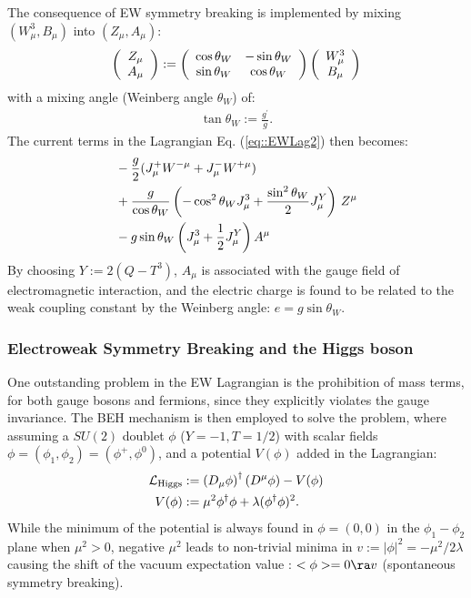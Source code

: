 The consequence of EW symmetry breaking is implemented by mixing $(W_\mu^3, B_\mu)$ into $(Z_\mu, A_\mu)$:
\begin{align}
\left( \begin{array}{c} Z_\mu \\ A_\mu \end{array} \right) := 
     \left(
   \begin{array}{cc}
     \cos{\theta_W} &  -\sin{\theta_W} \\ 
     \sin{\theta_W} &  \cos{\theta_W} 
   \end{array}
     \right)
 \left( \begin{array}{c} W_\mu^3 \\ B_\mu \end{array} \right)
\end{align}
with a mixing angle (Weinberg angle $\theta_W$) of:
\begin{align}
\tan{\theta_W} := \frac{g^{'}}{g}.
\end{align}
%
The current terms in the Lagrangian Eq. (\ref{eq::EWLag2}) then becomes:
\begin{align}
 & -\frac{g}{2} (J_\mu^+ W^{-\mu} + J_\mu^- W^{+\mu})  \nonumber \\
 & + \frac{g}{\cos{\theta_W}} \left( -\cos^2{\theta_W} J_\mu^3 + \frac{\sin^2{\theta_W}}{2} J_\mu^Y  \right) \, Z^{\mu}  \nonumber \\
 & - g\sin{\theta_W} \left( J_\mu^3 + \frac{1}{2} J_\mu^Y \right) A^\mu 
\end{align}
By choosing $Y := 2(Q-T^3)$, $A_\mu$ is associated with the gauge field of electromagnetic interaction, 
and the electric charge is found to be related to the weak coupling constant by the Weinberg angle: $e=g\sin{\theta_W}$.


\subsubsection{Electroweak Symmetry Breaking and the Higgs boson}
One outstanding problem in the EW Lagrangian is the prohibition of mass terms, for both gauge bosons and fermions, since they explicitly violates the gauge invariance. 
The BEH mechanism \cite{SSBBroutEnglert}\cite{SSBHiggs} is then employed to solve the problem, where assuming a $SU(2)$ doublet $\phi$ ($Y=-1, T=1/2$) with scalar fields $\phi=(\phi_1,\phi_2)=(\phi^+,\phi^0)$,  and a potential $V(\phi)$ added in the Lagrangian:
\begin{align}
\mathcal{L}_{\mathrm{Higgs}} & := \left(D_\mu \phi \right)^\dagger \left(D^\mu \phi \right) - V(\phi) \nonumber \\
                     V(\phi) & := \mu^2 \phi^\dagger \phi + \lambda (\phi^\dagger \phi)^2.
\label{eq::HiggsPotential}
\end{align}
While the minimum of the potential is always found in $\phi=(0,0)$ in the $\phi_1-\phi_2$ plane when $\mu^2>0$, 
negative $\mu^2$ leads to non-trivial minima in $v := |\phi|^2 = -\mu^2/2\lambda$ causing the shift of the vacuum expectation value : $<\phi>=0 \ra v$ (spontaneous symmetry breaking). \\

